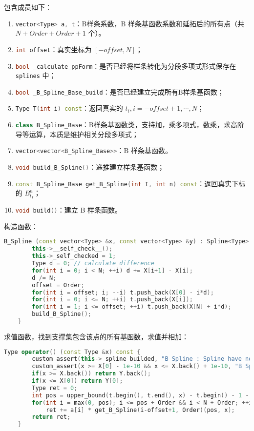 \documentclass[lang=cn,a4paper,newtx,bibend=bibtex]{elegantpaper}
\newcommand{\LII}{\lstinline[language=C++]}
\begin{document}
包含成员如下：
\begin{enumerate}
\item \LII{vector<Type> a, t}：B样条系数，B 样条基函数系数和延拓后的所有点（共 $N+Order+Order+1$ 个）。
\item \LII{int offset}：真实坐标为 $[-offset, N]$；
\item \LII{bool _calculate_ppForm}：是否已经将样条转化为分段多项式形式保存在 \LII{splines} 中；
\item \LII{bool _B_Spline_Base_build}：是否已经建立完成所有B样条基函数；
\item \LII{Type T(int i) const}：返回真实的 $t_i, i = -offset+1, \cdots, N$；
\item \LII{class B_Spline_Base}：B样条基函数类，支持加，乘多项式，数乘，求高阶导等运算，本质是维护相关分段多项式；
\item \LII{vector<vector<B_Spline_Base>>}：B 样条基函数。
\item \LII{void build_B_Spline()}：递推建立样条基函数；
\item \LII{const B_Spline_Base get_B_Spline(int I, int n) const}：返回真实下标的 $B_{t_I}^n$；
\item \LII{void build()}：建立 B 样条函数。
\end{enumerate}

构造函数：

\begin{lstlisting}[language=C++]
    B_Spline (const vector<Type> &x, const vector<Type> &y) : Spline<Type>(x, y), _calculate_ppForm(0), _B_Spline_Base_build(0) {
		this->__self_check__();
		this->_self_checked = 1;
		Type d = 0; // calculate difference
		for(int i = 0; i < N; ++i) d += X[i+1] - X[i];
		d /= N;
		offset = Order;
		for(int i = offset; i; --i) t.push_back(X[0] - i*d);
		for(int i = 0; i <= N; ++i) t.push_back(X[i]);
		for(int i = 1; i <= offset; ++i) t.push_back(X[N] + i*d);
		build_B_Spline();
	}
\end{lstlisting}

求值函数，找到支撑集包含该点的所有基函数，求值并相加：

\begin{lstlisting}[language=C++]
    Type operator() (const Type &x) const {
		custom_assert(this->_spline_builded, "B Spline : Spline have not been built yet.");
        custom_assert(x >= X[0] - 1e-10 && x <= X.back() + 1e-10, "B Spline : Input x is out of range.");
		if(x >= X.back()) return Y.back();
		if(x <= X[0]) return Y[0];
		Type ret = 0;
		int pos = upper_bound(t.begin(), t.end(), x) - t.begin() - 1 - offset;
		for(int i = max(0, pos); i <= pos + Order && i < N + Order; ++i)
			ret += a[i] * get_B_Spline(i-offset+1, Order)(pos, x);
		return ret;
	}
\end{lstlisting}
\end{document}
